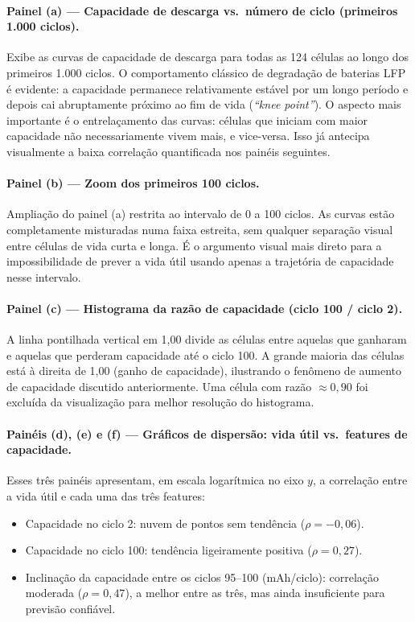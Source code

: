 \documentclass[12pt, a4paper]{article}
\begin{document}
\paragraph{Painel (a) --- Capacidade de descarga vs.\ número de ciclo
(primeiros 1.000 ciclos).}
Exibe as curvas de capacidade de descarga para todas as 124 células ao
longo dos primeiros 1.000 ciclos. O comportamento clássico de degradação de
baterias LFP é evidente: a capacidade permanece relativamente estável por
um longo período e depois cai abruptamente próximo ao fim de vida
(\textit{``knee point''}). O aspecto mais importante é o entrelaçamento
das curvas: células que iniciam com maior capacidade não necessariamente
vivem mais, e vice-versa. Isso já antecipa visualmente a baixa correlação
quantificada nos painéis seguintes.

\paragraph{Painel (b) --- Zoom dos primeiros 100 ciclos.}
Ampliação do painel (a) restrita ao intervalo de 0 a 100 ciclos. As curvas
estão completamente misturadas numa faixa estreita, sem qualquer separação
visual entre células de vida curta e longa. É o argumento visual mais direto
para a impossibilidade de prever a vida útil usando apenas a trajetória de
capacidade nesse intervalo.

\paragraph{Painel (c) --- Histograma da razão de capacidade (ciclo 100 /
ciclo 2).}
A linha pontilhada vertical em 1,00 divide as células entre aquelas que
ganharam e aquelas que perderam capacidade até o ciclo 100. A grande maioria
das células está à direita de 1,00 (ganho de capacidade), ilustrando o
fenômeno de aumento de capacidade discutido anteriormente. Uma célula
com razão $\approx 0{,}90$ foi excluída da visualização para melhor
resolução do histograma.

\paragraph{Painéis (d), (e) e (f) --- Gráficos de dispersão: vida útil
vs.\ features de capacidade.}
Esses três painéis apresentam, em escala logarítmica no eixo $y$, a
correlação entre a vida útil e cada uma das três features:

\begin{itemize}
  \item[(d)] Capacidade no ciclo 2: nuvem de pontos sem tendência ($\rho = -0{,}06$).
  \item[(e)] Capacidade no ciclo 100: tendência ligeiramente positiva ($\rho = 0{,}27$).
  \item[(f)] Inclinação da capacidade entre os ciclos 95--100
  (mAh/ciclo): correlação moderada ($\rho = 0{,}47$), a melhor
  entre as três, mas ainda insuficiente para previsão confiável.
\end{itemize}
\end{document}
